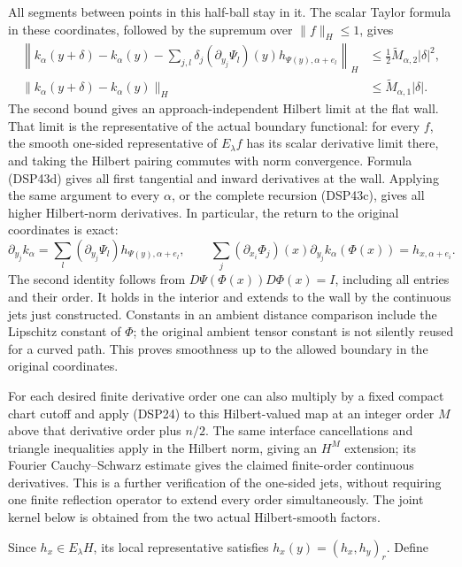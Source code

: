 \documentclass[
  11pt,
]{article}
\begin{document}
All segments between points in this half-ball stay in it. The scalar
Taylor formula in these coordinates, followed by the supremum over
\(\|f\|_H\leq1\), gives \[
 \begin{split}
 \left\|k_\alpha(y+\delta)-k_\alpha(y)
  -\sum_{j,l}\delta_j(\partial_{y_j}\Psi_l)(y)
           h_{\Psi(y),\alpha+e_l}\right\|_H
 &\leq\tfrac12\widetilde M_{\alpha,2}|\delta|^2,\\
 \|k_\alpha(y+\delta)-k_\alpha(y)\|_H
 &\leq\widetilde M_{\alpha,1}|\delta|.
 \end{split}
 \tag{DSP43d}
\] The second bound gives an approach-independent Hilbert limit at the
flat wall. That limit is the representative of the actual boundary
functional: for every \(f\), the smooth one-sided representative of
\(E_\lambda f\) has its scalar derivative limit there, and taking the
Hilbert pairing commutes with norm convergence. Formula (DSP43d) gives
all first tangential and inward derivatives at the wall. Applying the
same argument to every \(\alpha\), or the complete recursion (DSP43c),
gives all higher Hilbert-norm derivatives. In particular, the return to
the original coordinates is exact: \[
 \partial_{y_j}k_\alpha
 =\sum_l(\partial_{y_j}\Psi_l)h_{\Psi(y),\alpha+e_l},
 \qquad
 \sum_j(\partial_{x_i}\Phi_j)(x)
       \partial_{y_j}k_\alpha(\Phi(x))
 =h_{x,\alpha+e_i}.
 \tag{DSP43e}
\] The second identity follows from \(D\Psi(\Phi(x))D\Phi(x)=I\),
including all entries and their order. It holds in the interior and
extends to the wall by the continuous jets just constructed. Constants
in an ambient distance comparison include the Lipschitz constant of
\(\Phi\); the original ambient tensor constant is not silently reused
for a curved path. This proves smoothness up to the allowed boundary in
the original coordinates.

For each desired finite derivative order one can also multiply by a
fixed compact chart cutoff and apply (DSP24) to this Hilbert-valued map
at an integer order \(M\) above that derivative order plus \(n/2\). The
same interface cancellations and triangle inequalities apply in the
Hilbert norm, giving an \(H^M\) extension; its Fourier Cauchy--Schwarz
estimate gives the claimed finite-order continuous derivatives. This is
a further verification of the one-sided jets, without requiring one
finite reflection operator to extend every order simultaneously. The
joint kernel below is obtained from the two actual Hilbert-smooth
factors.

Since \(h_x\in E_\lambda H\), its local representative satisfies
\(h_x(y)=(h_x,h_y)_r\). Define
\end{document}
